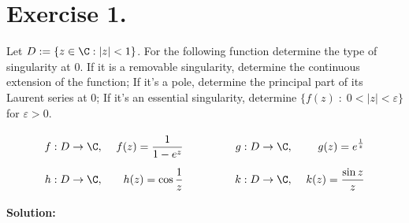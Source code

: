 \section*{Exercise 1.}

Let $D := \{ z \in \C : |z| < 1\}$. For the following function determine the type of singularity at 0. If it is a removable singularity, determine the continuous extension of the function; If it's a pole, determine the principal part of its Laurent series at 0; If it's an essential singularity, determine $\{f(z) \;:\; 0<|z| < \varepsilon\}$ for $\varepsilon > 0$.
\[ \everymath{\displaystyle}
\arraycolsep=1.8pt\def\arraystretch{2.5}
\begin{array}{rrcrr}
    f : D \to \C,\hspace{1em} & f(z) = \frac{1}{1-e^z} & \hspace{4em} & g : D \to \C,\hspace{1em} & g(z) = e^{\frac{1}{z}}\\
    h : D \to \C,\hspace{1em} & h(z) = \cos\frac{1}{z} & \hspace{4em} & k : D \to \C,\hspace{1em} & k(z) = \frac{\sin z}{z}
\end{array}
\]

\textbf{Solution:}

